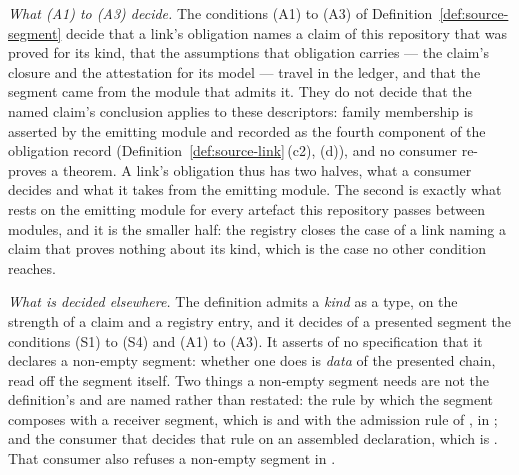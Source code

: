 
\begin{remark}\label{rem:segment-scope}
\emph{What (A1) to (A3) decide.} The conditions (A1) to (A3) of
Definition~\ref{def:source-segment} decide that a link's obligation names a
claim of this repository that was proved for its kind, that the assumptions
that obligation carries --- the claim's closure and the attestation for its
model --- travel in the ledger, and that the segment came from the module that
admits it. They do not decide that the named claim's conclusion applies to
these descriptors: family membership is asserted by the emitting module and
recorded as the fourth component of the obligation record
(Definition~\ref{def:source-link}\,(c2), (d)), and no consumer re-proves a
theorem. A link's obligation thus has two halves, what a consumer decides and
what it takes from the emitting module. The second is exactly what rests on
the emitting module for every artefact this repository passes between
modules, and it is the smaller half: the registry closes the case of a link
naming a claim that proves nothing about its kind, which is the case no other
condition reaches.

\emph{What is decided elsewhere.} The definition admits a \emph{kind} as a
type, on the strength of a claim and a registry entry, and it decides of a
presented segment the conditions (S1) to (S4) and (A1) to (A3). It asserts of
no specification that it declares a non-empty segment: whether one does is
\emph{data} of the presented chain, read off the segment itself. Two things a
non-empty segment needs are not the definition's and are named rather than
restated: the rule by which the segment composes with a receiver segment,
which is  and
 with the admission rule of
, in ; and the consumer that
decides that rule on an assembled declaration, which is
. That consumer also refuses a
non-empty segment in .
\end{remark}
